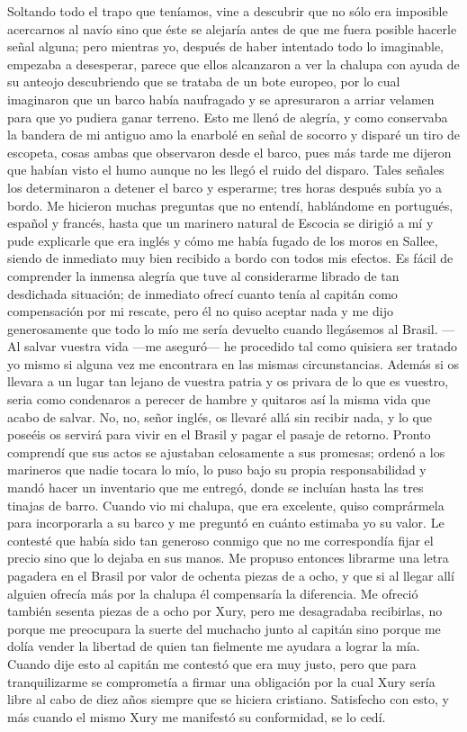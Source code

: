 \documentclass{novela}
\begin{document}
    Soltando todo el trapo que teníamos, vine a descubrir que no sólo era imposible acercarnos al navío sino que éste se alejaría antes de que me fuera posible hacerle señal alguna; pero mientras yo, después de haber intentado todo lo imaginable, empezaba a desesperar, parece que ellos alcanzaron a ver la chalupa con ayuda de su anteojo descubriendo que se trataba de un bote europeo, por lo cual imaginaron que un barco había naufragado y se apresuraron a arriar velamen para que yo pudiera ganar terreno. Esto me llenó de alegría, y como conservaba la bandera de mi antiguo amo la enarbolé en señal de socorro y disparé un tiro de escopeta, cosas ambas que observaron desde el barco, pues más tarde me dijeron que habían visto el humo aunque no les llegó el ruido del disparo. Tales señales los determinaron a detener el barco y esperarme; tres horas después subía yo a bordo.
    Me hicieron muchas preguntas que no entendí, hablándome en portugués, español y francés, hasta que un marinero natural de Escocia se dirigió a mí y pude explicarle que era inglés y cómo me había fugado de los moros en Sallee, siendo de inmediato muy bien recibido a bordo con todos mis efectos.
    Es fácil de comprender la inmensa alegría que tuve al considerarme librado de tan desdichada situación; de inmediato ofrecí cuanto tenía al capitán como compensación por mi rescate, pero él no quiso aceptar nada y me dijo generosamente que todo lo mío me sería devuelto cuando llegásemos al Brasil.
    —Al salvar vuestra vida —me aseguró— he procedido tal como quisiera ser tratado yo mismo si alguna vez me encontrara en las mismas circunstancias. Además si os llevara a un lugar tan lejano de vuestra patria y os privara de lo que es vuestro, seria como condenaros a perecer de hambre y quitaros así la misma vida que acabo de salvar. No, no, señor inglés, os llevaré allá sin recibir nada, y lo que poseéis os servirá para vivir en el Brasil y pagar el pasaje de retorno.
    Pronto comprendí que sus actos se ajustaban celosamente a sus promesas; ordenó a los marineros que nadie tocara lo mío, lo puso bajo su propia responsabilidad y mandó hacer un inventario que me entregó, donde se incluían hasta las tres tinajas de barro.
    Cuando vio mi chalupa, que era excelente, quiso comprármela para incorporarla a su barco y me preguntó en cuánto estimaba yo su valor. Le contesté que había sido tan generoso conmigo que no me correspondía fijar el precio sino que lo dejaba en sus manos. Me propuso entonces librarme una letra pagadera en el Brasil por valor de ochenta piezas de a ocho, y que si al llegar allí alguien ofrecía más por la chalupa él compensaría la diferencia. Me ofreció también sesenta piezas de a ocho por Xury, pero me desagradaba recibirlas, no porque me preocupara la suerte del muchacho junto al capitán sino porque me dolía vender la libertad de quien tan fielmente me ayudara a lograr la mía. Cuando dije esto al capitán me contestó que era muy justo, pero que para tranquilizarme se comprometía a firmar una obligación por la cual Xury sería libre al cabo de diez años siempre que se hiciera cristiano. Satisfecho con esto, y más cuando el mismo Xury me manifestó su conformidad, se lo cedí.
\end{document}
